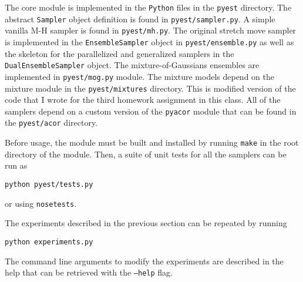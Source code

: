 \documentclass[12pt,preprint]{aastex}
\newcommand{\project}[1]{\texttt{#1}}
\begin{document}
The core module is implemented in the \project{Python} files in the \texttt{pyest}
directory. The abstract \texttt{Sampler} object definition is found in
\texttt{pyest/sampler.py}. A simple vanilla M-H sampler is found in \texttt{pyest/mh.py}.
The original stretch move sampler is implemented in the \texttt{EnsembleSampler}
object in \texttt{pyest/ensemble.py} as well as the skeleton for the parallelized
and generalized samplers in the \texttt{DualEnsembleSampler} object. The
mixture-of-Gaussians ensembles are implemented in \texttt{pyest/mog.py} module.
The mixture models depend on the mixture module in the \texttt{pyest/mixtures}
directory. This is modified version of the code that I wrote for the third
homework assignment in this class. All of the samplers depend on a custom version
of the \project{pyacor} module that can be found in the \texttt{pyest/acor} directory.

Before usage, the module must be built and installed by running \texttt{make}
in the root directory of the module. Then, a suite of unit tests for all the
samplers can be run as

\texttt{python pyest/tests.py}

\noindent or using \texttt{nosetests}.

The experiments described in the previous section can be repeated by running

\texttt{python experiments.py}

\noindent The command line arguments to modify the experiments are described in
the help that can be retrieved with the \texttt{--help} flag.
\end{document}
